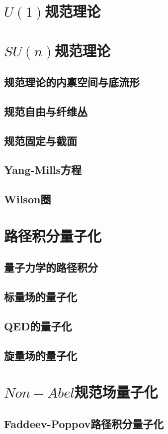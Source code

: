 \documentclass[a4paper,11pt]{article}
\theoremstyle{mystyle}
\begin{document}
\section{$U(1)$规范理论}
\section{$SU(n)$规范理论}
\subsection{规范理论的内禀空间与底流形}
\subsection{规范自由与纤维丛}
\subsection{规范固定与截面}
\subsection{Yang-Mills方程}
\subsection{Wilson圈}
\section{路径积分量子化}
\subsection{量子力学的路径积分}
\subsection{标量场的量子化}
\subsection{QED的量子化}
\subsection{旋量场的量子化}
\section{$Non-Abel$规范场量子化}
\subsection{Faddeev-Poppov路径积分量子化}
\end{document}
